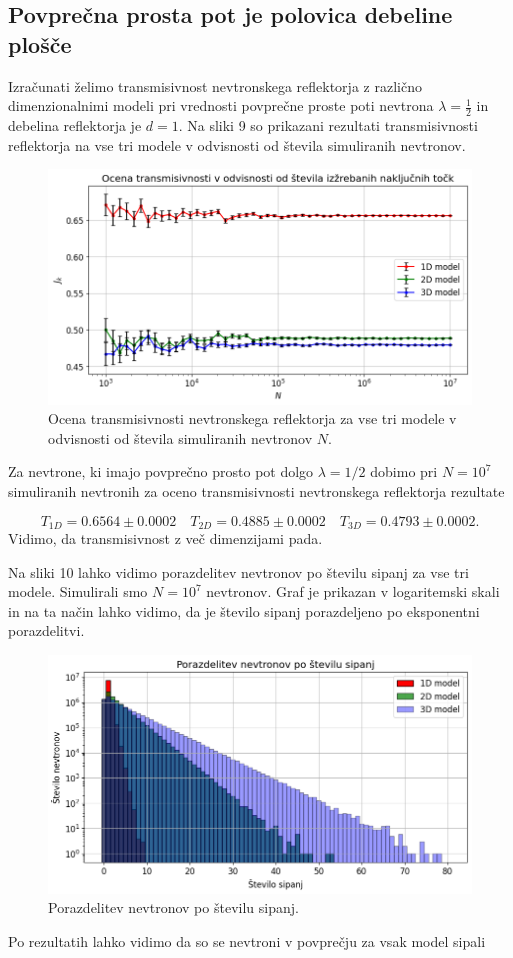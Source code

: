 \documentclass[slovene,11pt,a4paper]{article}
\begin{document}
\subsection{Povprečna prosta pot je polovica debeline plošče}

Izračunati želimo transmisivnost nevtronskega reflektorja z različno dimenzionalnimi modeli pri vrednosti povprečne proste poti nevtrona $\lambda = \frac{1}{2}$ in debelina reflektorja je $d=1$. Na sliki 9 so prikazani rezultati transmisivnosti reflektorja na vse tri modele v odvisnosti od števila simuliranih nevtronov.

\begin{figure}[h!]
\centering
\includegraphics[width=13cm]{nev1.png}
\caption{Ocena transmisivnosti nevtronskega reflektorja za vse tri modele v odvisnosti od števila simuliranih nevtronov $N$.}
\end{figure}
Za nevtrone, ki imajo povprečno prosto pot dolgo $\lambda=1/2$ dobimo pri $N=10^7$ simuliranih nevtronih za oceno transmisivnosti nevtronskega reflektorja rezultate

\[
T_{1D} = 0.6564 \pm 0.0002 \quad
T_{2D} = 0.4885 \pm 0.0002 \quad
T_{3D} = 0.4793 \pm 0.0002.
\]
Vidimo, da transmisivnost z več dimenzijami pada.

Na sliki 10 lahko vidimo porazdelitev nevtronov po številu sipanj za vse tri modele. Simulirali smo $N = 10^7$ nevtronov. Graf je prikazan v logaritemski skali in na ta način lahko vidimo, da je število sipanj porazdeljeno po eksponentni porazdelitvi.

\begin{figure}[h!]
\centering
\includegraphics[width=13cm]{nev2.png}
\caption{Porazdelitev nevtronov po številu sipanj.}
\end{figure}
\noindent Po rezultatih lahko vidimo da so se nevtroni v povprečju za vsak model sipali
\end{document}
